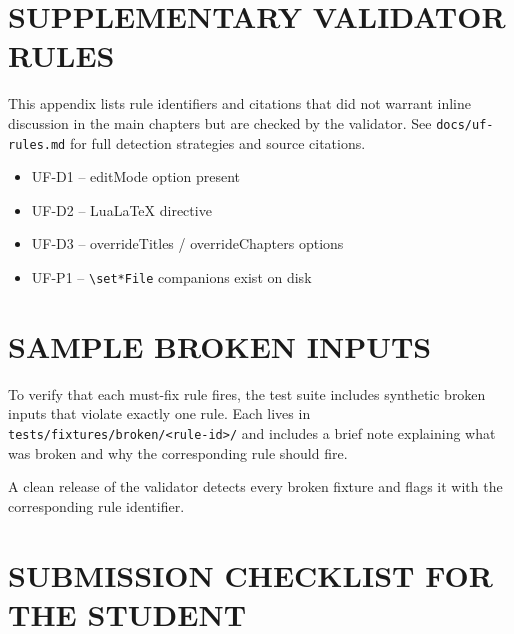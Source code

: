 
\chapter{SUPPLEMENTARY VALIDATOR RULES}\label{app:rules}

This appendix lists rule identifiers and citations that did not warrant
inline discussion in the main chapters but are checked by the
validator. See \texttt{docs/uf-rules.md} for full detection strategies
and source citations.

\begin{itemize}
    \item UF-D1 -- editMode option present
    \item UF-D2 -- LuaLaTeX directive
    \item UF-D3 -- overrideTitles / overrideChapters options
    \item UF-P1 -- \texttt{\textbackslash set*File} companions exist on disk
\end{itemize}

\chapter{SAMPLE BROKEN INPUTS}\label{app:fixtures}

To verify that each must-fix rule fires, the test suite includes
synthetic broken inputs that violate exactly one rule. Each lives in
\texttt{tests/fixtures/broken/<rule-id>/} and includes a brief note
explaining what was broken and why the corresponding rule should fire.

A clean release of the validator detects every broken fixture and
flags it with the corresponding rule identifier.

\chapter{SUBMISSION CHECKLIST FOR THE STUDENT}\label{app:checklist}

